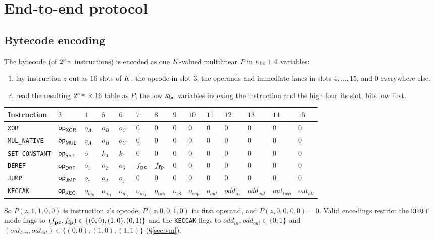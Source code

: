 \section{End-to-end protocol}\label{sec:e2e}

\subsection{Bytecode encoding}\label{sec:e2e-bc}

The bytecode (of $2^{\kappa_{\mathrm{bc}}}$ instructions) is encoded as one $K$-valued multilinear $P$ in $\kappa_{\mathrm{bc}}+4$ variables:
\begin{enumerate}[itemsep=1pt,topsep=3pt]
\item lay instruction $z$ out as $16$ slots of $K$: the opcode in slot $3$, the operands and immediate lanes in slots $4,\dots,15$, and $0$ everywhere else.
\item read the resulting $2^{\kappa_{\mathrm{bc}}}\times16$ table as $P$, the low $\kappa_{\mathrm{bc}}$ variables indexing the instruction and the high four its slot, bits low first.
\end{enumerate}
\begin{center}
\setlength{\tabcolsep}{3.5pt}
\begin{tabular}{llllllllllllll}
\hline
Instruction & $3$ & $4$ & $5$ & $6$ & $7$ & $8$ & $9$ & $10$ & $11$ & $12$ & $13$ & $14$ & $15$\\
\hline
\texttt{XOR}           & $\mathsf{op}_{\mathsf{XOR}}$ & $o_A$ & $o_B$ & $o_C$ & $0$ & $0$ & $0$ & $0$ & $0$ & $0$ & $0$ & $0$ & $0$\\
\texttt{MUL\_NATIVE}   & $\mathsf{op}_{\mathsf{MUL}}$ & $o_A$ & $o_B$ & $o_C$ & $0$ & $0$ & $0$ & $0$ & $0$ & $0$ & $0$ & $0$ & $0$\\
\texttt{SET\_CONSTANT} & $\mathsf{op}_{\mathsf{SET}}$ & $o$   & $k_0$ & $k_1$ & $0$ & $0$ & $0$ & $0$ & $0$ & $0$ & $0$ & $0$ & $0$\\
\texttt{DEREF}         & $\mathsf{op}_{\mathsf{DRF}}$ & $o_1$ & $o_2$ & $o_3$ & $f_{\mathbf{pc}}$ & $f_{\mathbf{fp}}$ & $0$ & $0$ & $0$ & $0$ & $0$ & $0$ & $0$\\
\texttt{JUMP}          & $\mathsf{op}_{\mathsf{JMP}}$ & $o_c$ & $o_d$ & $o_f$ & $0$ & $0$ & $0$ & $0$ & $0$ & $0$ & $0$ & $0$ & $0$\\
\texttt{KECCAK}        & $\mathsf{op}_{\mathsf{KEC}}$ & $o_{m_0}$ & $o_{m_1}$ & $o_{m_2}$ & $o_{m_3}$ & $o_{\mathit{tail}}$ & $o_{\mathit{b8}}$ & $o_{\mathit{cap}}$ & $o_{\mathit{out}}$ & $\mathit{odd}_{\mathit{in}}$ & $\mathit{odd}_{\mathit{out}}$ & $\mathit{out}_{\mathit{two}}$ & $\mathit{out}_{\mathit{all}}$\\
\hline
\end{tabular}
\end{center}
So $P(z,1,1,0,0)$ is instruction $z$'s opcode, $P(z,0,0,1,0)$ its first operand, and $P(z,0,0,0,0)=0$. Valid encodings restrict the \texttt{DEREF} mode flags to $(f_{\mathbf{pc}},f_{\mathbf{fp}})\in\{(0,0),(1,0),(0,1)\}$ and the \texttt{KECCAK} flags to $\mathit{odd}_{\mathit{in}},\mathit{odd}_{\mathit{out}}\in\{0,1\}$ and $(\mathit{out}_{\mathit{two}},\mathit{out}_{\mathit{all}})\in\{(0,0),(1,0),(1,1)\}$ (\S\ref{sec:vm}).

